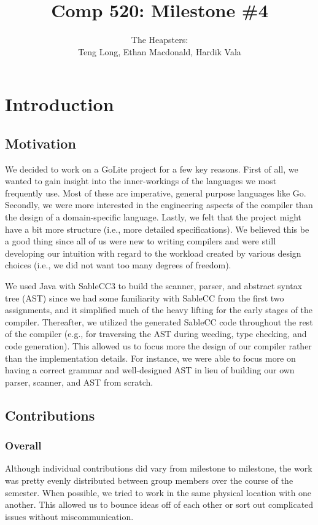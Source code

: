 \documentclass{article}
\title{Comp 520: Milestone \#4}
\author{The Heapsters: \\Teng Long, Ethan Macdonald, Hardik Vala}
\begin{document}
\maketitle

\section{Introduction}

\subsection{Motivation}
We decided to work on a GoLite project for a few key reasons. First of all, we wanted to gain insight into the inner-workings of the languages we most frequently use. Most of these are imperative, general purpose languages like Go. Secondly, we were more interested in the engineering aspects of the compiler than the design of a domain-specific language. Lastly, we felt that the project might have a bit more structure (i.e., more detailed specifications). We believed this be a good thing since all of us were new to writing compilers and were still developing our intuition with regard to the workload created by various design choices (i.e., we did not want too many degrees of freedom).

We used Java with SableCC3 to build the scanner, parser, and abstract syntax tree (AST) since we had some familiarity with SableCC from the first two assignments, and it simplified much of the heavy lifting for the early stages of the compiler. Thereafter, we utilized the generated SableCC code throughout the rest of the compiler (e.g., for traversing the AST during weeding, type checking, and code generation). This allowed us to focus more the design of our compiler rather than the implementation details. For instance, we were able to focus more on having a correct grammar and well-designed AST in lieu of building our own parser, scanner, and AST from scratch. 

\subsection{Contributions}
\subsubsection{Overall}
Although individual contributions did vary from milestone to milestone, the work was pretty evenly distributed between group members over the course of the semester. When possible, we tried to work in the same physical location with one another. This allowed us to bounce ideas off of each other or sort out complicated issues without miscommunication.
\end{document}
